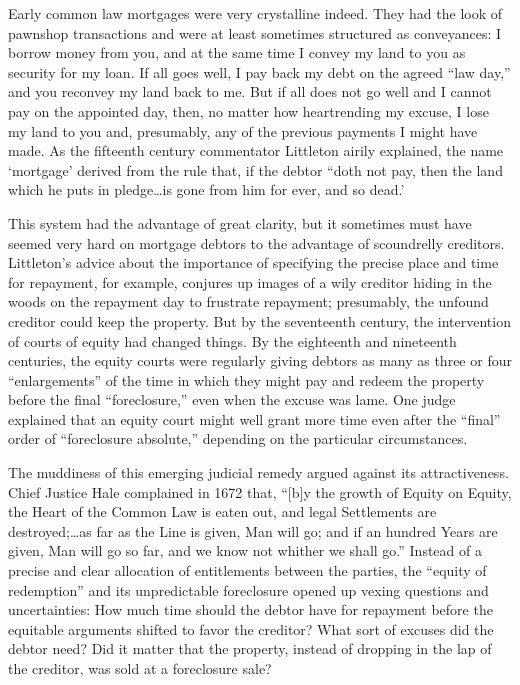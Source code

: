 Early common law mortgages were very crystalline indeed. They had the look of
pawnshop transactions and were at least sometimes structured as conveyances: I
borrow money from you, and at the same time I convey my land to you as security
for my loan. If all goes well, I pay back my debt on the agreed ``law day,'' and
you reconvey my land back to me. But if all does not go well and I cannot pay
on the appointed day, then, no matter how heartrending my excuse, I lose my
land to you and, presumably, any of the previous payments I might have made. As
the fifteenth century commentator Littleton airily explained, the name
`mortgage' derived from the rule that, if the debtor ``doth not pay, then the
land which he puts in pledge\dots is gone from him for ever, and so dead.'  

This system had the advantage of great clarity, but it sometimes must have
seemed very hard on mortgage debtors to the advantage of scoundrelly creditors.
Littleton's advice about the importance of specifying the precise place and
time for repayment, for example, conjures up images of a wily creditor hiding
in the woods on the repayment day to frustrate repayment; presumably, the
unfound creditor could keep the property. But by the seventeenth century, the
intervention of courts of equity had changed things. By the eighteenth and
nineteenth centuries, the equity courts were regularly giving debtors as many
as three or four ``enlargements'' of the time in which they might pay and redeem
the property before the final ``foreclosure,'' even when the excuse was lame.
One judge explained that an equity court might well grant more time even after
the ``final'' order of ``foreclosure absolute,'' depending on the particular
circumstances.  

The muddiness of this emerging judicial remedy argued against its
attractiveness. Chief Justice Hale complained in 1672 that, ``[b]y the growth of
Equity on Equity, the Heart of the Common Law is eaten out, and legal
Settlements are destroyed;\ldots as far as the Line is given, Man will go; and
if an hundred Years are given, Man will go so far, and we know not whither we
shall go.'' Instead of a precise and clear allocation of entitlements between
the parties, the ``equity of redemption'' and its unpredictable foreclosure
opened up vexing questions and uncertainties: How much time should the debtor
have for repayment before the equitable arguments shifted to favor the
creditor? What sort of excuses did the debtor need? Did it matter that the
property, instead of dropping in the lap of the creditor, was sold at a
foreclosure sale?

